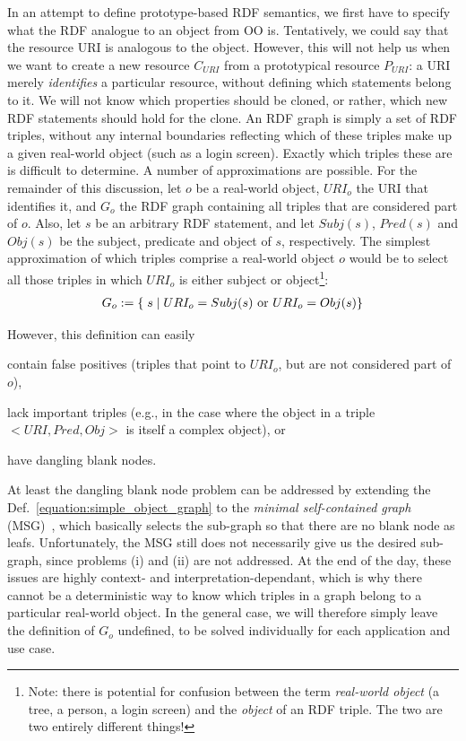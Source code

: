 \documentclass{article}
\begin{document}
In an attempt to define prototype-based RDF semantics, we first have to specify what the RDF analogue to an object from OO is. Tentatively, we could say that the resource URI is analogous to the object. However, this will not help us when we want to create a new resource $C_{URI}$ from a prototypical resource $P_{URI}$: a URI merely \emph{identifies} a particular resource, without defining which statements belong to it. We will not know which properties should be cloned, or rather, which new RDF statements should hold for the clone. An RDF graph is simply a set of RDF triples, without any internal boundaries reflecting which of these triples make up a given real-world object (such as a login screen).  Exactly which triples these are is difficult to determine. A number of approximations are possible. For the remainder of this discussion, let $o$ be a real-world object, $URI_o$ the URI that identifies it, and $G_o$ the RDF graph containing all triples that are considered part of $o$. 
Also, let $s$ be an arbitrary RDF statement, and let $Subj(s)$, $Pred(s)$ and $Obj(s)$ be the subject, predicate and object of $s$, respectively. The simplest approximation of which triples comprise a real-world object $o$ would be to select all those triples in which $URI_o$ is either subject or object\footnote{Note: there is potential for confusion between the term \emph{real-world object} (a tree, a person, a login screen) and the \emph{object} of an RDF triple. The two are two entirely different things!}:
\begin{align}
	\label{equation:simple_object_graph}
	G_o := \{\;s\;|\;URI_o=Subj(s) \textnormal{ or } URI_o=Obj(s)\}
\end{align}

However, this definition can easily 
\begin{inparaenum}[(i)]
	\item contain false positives (triples that point to $URI_o$, but are not considered part of $o$), 
	\item lack important triples (e.g., in the case where the object in a triple $<URI, Pred, Obj>$ is itself a complex object), or 
	\item have dangling blank nodes.
\end{inparaenum}
At least the dangling blank node problem can be addressed by extending the Def.~\ref{equation:simple_object_graph} to the \emph{minimal self-contained graph} (MSG)~\cite{Tummarello:2008kl}, which basically selects the sub-graph so that there are no blank node as leafs. Unfortunately, the MSG still does not necessarily give us the desired sub-graph, since problems (i) and (ii) are not addressed. At the end of the day, these issues are highly context- and interpretation-dependant, which is why there cannot be a deterministic way to know which triples in a graph belong to a particular real-world object. In the general case, we will therefore simply leave the definition of $G_o$ undefined, to be solved individually for each application and use case. 
\end{document}
